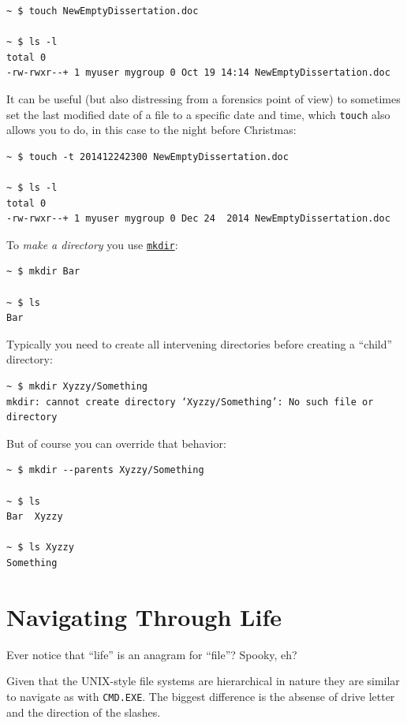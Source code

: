 \documentclass[10pt,]{book}
\numberwithin{figure}{chapter}
\begin{document}
\begin{verbatim}
~ $ touch NewEmptyDissertation.doc

~ $ ls -l
total 0
-rw-rwxr--+ 1 myuser mygroup 0 Oct 19 14:14 NewEmptyDissertation.doc
\end{verbatim}

It can be useful (but also distressing from a forensics point of view)
to sometimes set the last modified date of a file to a specific date and
time, which \texttt{touch} also allows you to do, in this case to the
night before Christmas:

\begin{verbatim}
~ $ touch -t 201412242300 NewEmptyDissertation.doc

~ $ ls -l
total 0
-rw-rwxr--+ 1 myuser mygroup 0 Dec 24  2014 NewEmptyDissertation.doc
\end{verbatim}

To \emph{make a directory} you use
\href{http://linux.die.net/man/1/mkdir}{\texttt{mkdir}}:

\begin{verbatim}
~ $ mkdir Bar

~ $ ls
Bar
\end{verbatim}

Typically you need to create all intervening directories before creating
a ``child'' directory:

\begin{verbatim}
~ $ mkdir Xyzzy/Something
mkdir: cannot create directory ‘Xyzzy/Something’: No such file or directory
\end{verbatim}

But of course you can override that behavior:

\begin{verbatim}
~ $ mkdir --parents Xyzzy/Something

~ $ ls
Bar  Xyzzy

~ $ ls Xyzzy
Something
\end{verbatim}

\section{Navigating Through Life}\label{navigating-through-life}

Ever notice that ``life'' is an anagram for ``file''? Spooky, eh?

Given that the UNIX-style file systems are hierarchical in nature they
are similar to navigate as with \texttt{CMD.EXE}. The biggest difference
is the absense of drive letter and the direction of the slashes.
\end{document}
